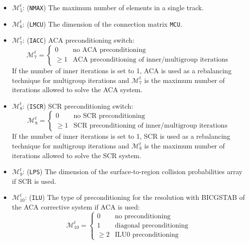 \begin{itemize}
\item $\mathcal{M}^{t}_{5}$: ({\tt NMAX}) The maximum number of elements in a single track.

\item $\mathcal{M}^{t}_{6}$: ({\tt LMCU}) The dimension of the connection matrix {\tt MCU}.

\item $\mathcal{M}^{t}_{7}$: ({\tt IACC}) ACA preconditioning switch:
\begin{displaymath}
\mathcal{M}^{t}_{7} = \left\{
\begin{array}{rl}
 0 & \textrm{no ACA preconditioning} \\
 \ge 1 & \textrm{ACA preconditioning of inner/multigroup iterations}
\end{array} \right.
\end{displaymath}
If the number of inner iterations is set to 1, ACA is used as a rebalancing technique for multigroup iterations and $\mathcal{M}^{t}_{7}$ is the maximum number of iterations allowed to solve the ACA system.

\item $\mathcal{M}^{t}_{8}$: ({\tt ISCR}) SCR preconditioning switch:
\begin{displaymath}
\mathcal{M}^{t}_{8} = \left\{
\begin{array}{rl}
 0 & \textrm{no SCR preconditioning} \\
 \ge 1 & \textrm{SCR preconditioning of inner/multigroup iterations}
\end{array} \right.
\end{displaymath}
If the number of inner iterations is set to 1, SCR is used as a rebalancing technique for multigroup iterations and $\mathcal{M}^{t}_{8}$ is the maximum number of iterations allowed to solve the SCR system.

\item $\mathcal{M}^{t}_{9}$: ({\tt LPS}) The dimension of the surface-to-region collision probabilities array if SCR is used.

\item $\mathcal{M}^{t}_{10}$: ({\tt ILU}) The type of preconditioning for the resolution with BICGSTAB of the ACA corrective system if ACA is used:
\begin{displaymath}
\mathcal{M}^{t}_{10} = \left\{
\begin{array}{rl}
 0 & \textrm{no preconditioning} \\
 1 & \textrm{diagonal preconditioning} \\
 \ge 2 & \textrm{ILU0 preconditioning}
\end{array} \right.
\end{displaymath}


\end{itemize}
